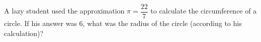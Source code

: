 A lazy student used the approximation $\pi=\dfrac{22}{7}$ to calculate the circumference of a circle. If his answer was $6$, what was the radius of the circle (according to his calculation)?
